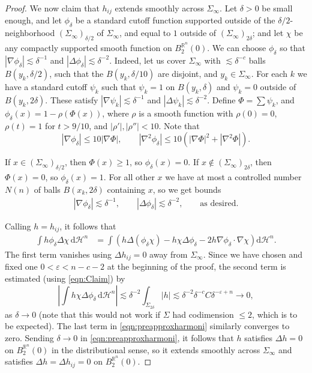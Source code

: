 \documentclass[12pt,a4paper,reqno]{amsart}
\renewcommand{\leq}{\leqslant}
\renewcommand{\geq}{\geqslant}
\renewcommand{\d}{\ensuremath{\mathrm d}}
\renewcommand{\epsilon}{\varepsilon}
\begin{document}
\begin{proof}
    We now claim that $h_{ij}$ extends smoothly across $\Sigma_\infty$. Let $\delta>0$ be small enough, and let $\phi_\delta$ be a standard cutoff function supported outside of the $\delta/2$-neighborhood $(\Sigma_\infty)_{\delta/2}$ of $\Sigma_\infty$, and equal to $1$ outside of $(\Sigma_\infty)_{2\delta}$; and let $\chi$ be any compactly supported smooth function on $B_2^{\mathbb R^n}(0)$. We can choose $\phi_\delta$ so that $|\nabla\phi_\delta| \lesssim \delta^{-1}$ and $|\Delta\phi_\delta| \lesssim \delta^{-2}$. Indeed, let us cover $\Sigma_\infty$ with $\lesssim \delta^{-c}$ balls $B(y_k, \delta/2)$, such that the $B(y_k, \delta/10)$ are disjoint, and $y_k\in \Sigma_\infty$. For each $k$ we have a standard cutoff $\psi_k$ such that $\psi_k=1$ on $B(y_k, \delta)$ and $\psi_k=0$ outside of $B(y_k, 2\delta)$. These satisfy $|\nabla\psi_k|\lesssim \delta^{-1}$ and $|\Delta\psi_k|\lesssim \delta^{-2}$. Define $\Phi = \sum\psi_k$, and $\phi_\delta(x) = 1 - \rho(\Phi(x))$, where $\rho$ is a smooth function with $\rho(0)=0$, $\rho(t)=1$ for $t > 9/10$, and $|\rho'|, |\rho''| < 10$. Note that
    \[ |\nabla\phi_\delta| \leq 10 |\nabla \Phi|, \qquad |\nabla^2 \phi_\delta|\leq 10( |\nabla \Phi|^2 + |\nabla^2\Phi|). \]

    If $x\in (\Sigma_\infty)_{\delta/2}$, then $\Phi(x)\geq 1$, so $\phi_\delta(x)=0$. If $x \not\in (\Sigma_\infty)_{2\delta}$, then $\Phi(x)=0$, so $\phi_\delta(x)=1$. For all other $x$ we have at most a controlled number $N(n)$ of balls $B(x_k, 2\delta)$ containing $x$, so we get bounds
    \[ \begin{aligned} 
    |\nabla\phi_\delta|\lesssim \delta^{-1}, \qquad |\Delta\phi_\delta|\lesssim \delta^{-2}, \qquad \text{as desired}. \end{aligned} \]
    
    Calling $h=h_{ij}$, it follows that
\begin{equation}\label{eqn:preapproxharmoni}
\begin{aligned}  
\int h \phi_\delta \Delta\chi\, \d\mathcal{H}^n &= \int \left(h \Delta(\phi_\delta \chi) - h \chi \Delta\phi_\delta - 2h\nabla\phi_\delta\cdot \nabla \chi\right)\d\mathcal{H}^n. 
\end{aligned}
\end{equation}
The first term vanishes using $\Delta h_{ij}=0$ away from $\Sigma_\infty$.  Since we have chosen and fixed one $0<\varepsilon < n-c-2$ at the beginning of the proof, the second term is estimated (using \eqref{eqn:Claim}) by
\[ \left|\int h \chi \Delta\phi_\delta\, \d\mathcal{H}^n \right| \lesssim \delta^{-2} \int_{\Sigma_{2\delta}} |h| \lesssim \delta^{-2} \delta^{-c} C\delta^{-\epsilon + n} \to 0,\]
as $\delta\to 0$ (note that this would not work if $\Sigma$ had codimension $\leq 2$, which is to be expected). The last term in \eqref{eqn:preapproxharmoni} similarly converges to zero. Sending $\delta\to 0$ in \eqref{eqn:preapproxharmoni}, it follows that $h$ satisfies $\Delta h=0$ on $B_2^{\mathbb R^n}(0)$ in the distributional sense, so it extends smoothly across $\Sigma_\infty$ and satisfies $\Delta h = \Delta h_{ij}=0$ on $B_2^{\mathbb R^n}(0)$.
\smallskip


\end{proof}
\end{document}
